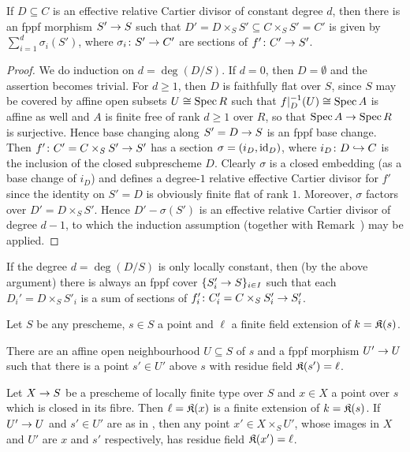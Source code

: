 \documentclass[a4paper,parskip=half,numbers=enddot, DIV=12]{scrreprt}
\renewcommand{\geq}{\geqslant}
\begin{document}
\begin{lem}
	If $D\subseteq C$ is an effective relative Cartier divisor of constant degree $d$, then there is an fppf morphism $S'\morphism S$ such that $D'=D\times_SS'\subseteq C\times_SS'=C'$ is given by $\sum_{i=1}^d\sigma_i(S')$, where $\sigma_i\colon S'\morphism C'$ are sections of $f'\colon C'\morphism S'$.
\end{lem}
\begin{proof}
	We do induction on $d=\deg(D/S)$. If $d=0$, then $D=\emptyset$ and the assertion becomes trivial. For $d\geq 1$, then $D$ is faithfully flat over $S$, since $S$ may be covered by affine open subsets $U\cong \operatorname{Spec} R$ such that $f|_D^{-1}(U)\cong \operatorname{Spec} A$ is affine as well and $A$ is finite free of rank $d\geq 1$ over $R$, so that $\Spec A\morphism\Spec R$ is surjective. Hence base changing along $S'=D\morphism S$ is an fppf base change. Then $f'\colon C'=C\times_SS'\morphism S'$ has a section $\sigma=(i_D,\operatorname{id}_D)$, where $i_D\colon D\monomorphism C$ is the inclusion of the closed subprescheme $D$. Clearly $\sigma$ is a closed embedding (as a base change of $i_D$) and defines a degree-$1$ relative effective Cartier divisor for $f'$ since the identity on $S'=D$ is obviously finite flat of rank $1$. Moreover, $\sigma$ factors over $D'=D\times_SS'$. Hence $D'-\sigma(S')$ is an effective relative Cartier divisor of degree $d-1$, to which the induction assumption (together with Remark~) may be applied.
\end{proof}
\begin{rem}
If the degree $d=\deg (D/S)$ is only locally constant, then (by the above argument) there is always an fppf cover $\{S'_i\morphism S\}_{i\in I}$ such that each $D_i'=D\times_SS'_i$ is a sum of sections of $f'_i\colon C'_i=C\times_SS'_i\morphism S'_i$.
\end{rem}
\begin{lem}
	Let $S$ be any prescheme, $s\in S$ a point and $\ell$ a finite field extension of $k=\mathfrak{K}(s)$.
	\begin{alphanumerate}
		\item There are an affine open neighbourhood $U\subseteq S$ of  $s$ and a fppf morphism $U'\morphism U$ such that there is a point $s'\in U'$ above $s$ with residue field $\mathfrak{K}(s')=\ell$.
		\item Let $X\morphism S$ be a prescheme of locally finite type over $S$ and $x\in X$ a point over $s$ which is closed in its fibre. Then $\ell=\mathfrak{K}(x)$ is a finite extension of $k=\mathfrak{K}(s)$. If $U'\morphism U$ and $s'\in U'$ are as in , then any point $x'\in X\times_SU'$, whose images in $X$ and $U'$ are $x$ and $s'$ respectively, has residue field $\mathfrak{K}(x')=\ell$.
	\end{alphanumerate}
	\end{lem}
\end{document}
